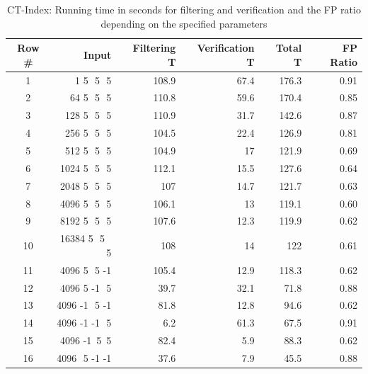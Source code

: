 \documentclass{l4proj}
\begin{document}
\newcommand\TstrutT{\rule{0pt}{2.6ex}} 
\newcommand\Bstrut{\rule[-1ex]{0pt}{0pt}} 

\begin{table}
\begin{center}
\renewcommand{\arraystretch}{1.2}
\begin{tabular}{ |c|r|r|r|r|r|}\hline
 Row \# & Input & Filtering T& Verification T& Total T& FP Ratio\\
 \hline
  1 & 1 5 \,\,5 \,\,5 & 108.9  & 67.4 & 176.3 & 0.91 \\
 \hline
  2 & 64 5 \,\,5 \,\,5 & 110.8 & 59.6 & 170.4 & 0.85 \\
 \hline
  3 & 128 5 \,\,5 \,\,5 & 110.9 & 31.7 & 142.6 & 0.87 \\
 \hline
  4 & 256 5 \,\,5 \,\,5 & 104.5 & 22.4 & 126.9 & 0.81 \\
 \hline
  5 & 512 5 \,\,5 \,\,5 & 104.9 & 17 & 121.9 & 0.69 \\
 \hline
  6 & 1024 5 \,\,5 \,\,5 & 112.1 & 15.5 & 127.6 & 0.64 \\
 \hline
  7 & 2048 5 \,\,5 \,\,5 & 107 & 14.7 & 121.7 & 0.63 \\
 \hline
  8 & 4096 5 \,\,5 \,\,5 & 106.1 & 13 & 119.1 & 0.60 \\
 \hline
  9 & 8192 5 \,\,5 \,\,5 & 107.6 & 12.3 & 119.9 & 0.62 \\
 \hline
  10 & 16384 5 \,\,5 \,\,5 & 108 & 14 & 122 & 0.61 \\
 \hline
  11 & 4096 5 \,\,5 -1 & 105.4 & 12.9 & 118.3 & 0.62 \\
 \hline
  12 & 4096 5 -1 \,\,5 & 39.7 & 32.1 & 71.8 & 0.88 \\
 \hline
  13 & 4096 -1 \,\,5 -1 & 81.8 & 12.8 & 94.6 & 0.62 \\
 \hline
  14 & 4096 -1 -1 \,\,5 & 6.2 & 61.3 & 67.5 & 0.91 \\
 \hline 
  15 & 4096 -1 \,5 \,5  & 82.4 & 5.9 & 88.3 & 0.62\\ 
 \hline
  16 & 4096 \,\,5 -1 -1 & 37.6  & 7.9 & 45.5 & 0.88 \\ 
 \hline 
\end{tabular}
\caption{CT-Index: Running time in seconds for filtering and verification and the FP ratio depending on the specified parameters}
\label{table:runningTime}
\end{center}
\end{table}
\end{document}
